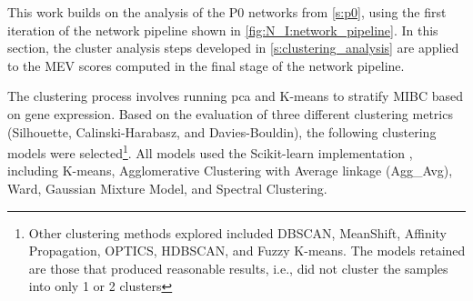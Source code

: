 This work builds on the analysis of the P0 networks from \cref{s:p0}, using the first iteration of the network pipeline shown in \cref{fig:N_I:network_pipeline}. In this section, the cluster analysis steps developed in \cref{s:clustering_analysis} are applied to the MEV scores computed in the final stage of the network pipeline.

The clustering process involves running \acrfull{pca} and K-means to stratify MIBC based on gene expression. Based on the evaluation of three different clustering metrics (Silhouette, Calinski-Harabasz, and Davies-Bouldin), the following clustering models were selected\footnote{Other clustering methods explored included DBSCAN, MeanShift, Affinity Propagation, OPTICS, HDBSCAN, and Fuzzy K-means. The models retained are those that produced reasonable results, i.e., did not cluster the samples into only 1 or 2 clusters}. All models used the Scikit-learn implementation \cite{Scikit-learn_undated-ax}, including K-means, Agglomerative Clustering with Average linkage (Agg\_Avg), Ward, Gaussian Mixture Model, and Spectral Clustering.

